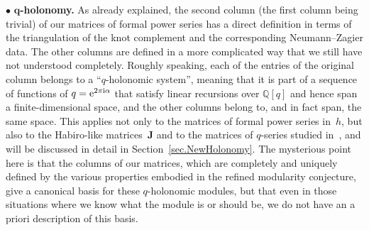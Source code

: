 \documentclass[pdftex]{sigma}
\numberwithin{equation}{section}
\def\a{\alpha}
\def\Q{\mathbb Q}
\def\a{\alpha}
\def\bJ{J} \def\bJ{\mathbf{J}}
\begin{document}
$\bullet$ {\bf $\boldsymbol{q}$-holonomy.}
As already explained, the second column (the
first column being trivial) of our matrices of formal power series has a direct
definition in terms of the triangulation of the knot complement and the corresponding
Neumann--Zagier data. The other columns are defined in a more complicated way that we
still have not understood completely. Roughly speaking, each of the entries of the
original column belongs to a ``$q$-holonomic system'', meaning that it is part of a
sequence of functions of $q={\rm e}^{2\pi{\rm i}\a}$ that satisfy linear recursions over $\Q[q]$
and hence span a finite-dimensional space, and the other columns belong to, and in
fact span, the same space. This applies not only to the matrices of formal power
series in~$h$, but also to the Habiro-like matrices~$\bJ$ and to the matrices of
$q$-series studied in~\cite{GZ:qseries}, and will be discussed in detail in
Section~\ref{sec.NewHolonomy}. The mysterious point here is that the columns of our
matrices, which are completely and uniquely defined by the various properties embodied
in the refined modularity conjecture, give a canonical basis for these $q$-holonomic
modules, but that even in those situations where we know what the module
is or should be, we do not have an a priori description of this basis.
\end{document}
